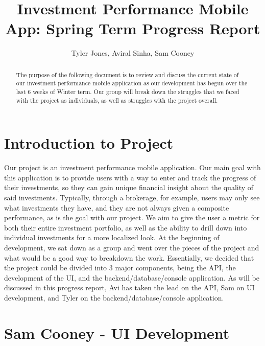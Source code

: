 \documentclass[letterpaper,10pt,titlepage,journal,compsoc,draftclsnofoot,onecolumn]{IEEEtran}
\title{Investment Performance Mobile App: Spring Term Progress Report}
\author{Tyler Jones, Aviral Sinha, Sam Cooney}
\newcommand\tab[1][1cm]{\hspace*{#1}}
\begin{document}
\begin{titlingpage}
    \maketitle
	\centering{}
    \begin{abstract}
        
     The purpose of the following document is to review and discuss the current state of our investment performance mobile application as our development has begun over the last 6 weeks of Winter term. Our group will break down the struggles that we faced with the project as individuals, as well as struggles with the project overall.
        
    \end{abstract}
\end{titlingpage}

\newpage

\tableofcontents{}

\newpage

\section{Introduction to Project}

\tab Our project is an investment performance mobile application. Our main goal with this application is to provide users with a way to enter and track the progress of their investments, so they can gain unique financial insight about the quality of said investments. Typically, through a brokerage, for example, users may only see what investments they have, and they are not always given a composite performance, as is the goal with our project. We aim to give the user a metric for both their entire investment portfolio, as well as the ability to drill down into individual investments for a more localized look. At the beginning of development, we sat down as a group and went over the pieces of the project and what would be a good way to breakdown the work. Essentially, we decided that the project could be divided into 3 major components, being the API, the development of the UI, and the backend/database/console application. As will be discussed in this progress report, Avi has taken the lead on the API, Sam on UI development, and Tyler on the backend/database/console application.

\section{Sam Cooney - UI Development}
\end{document}
